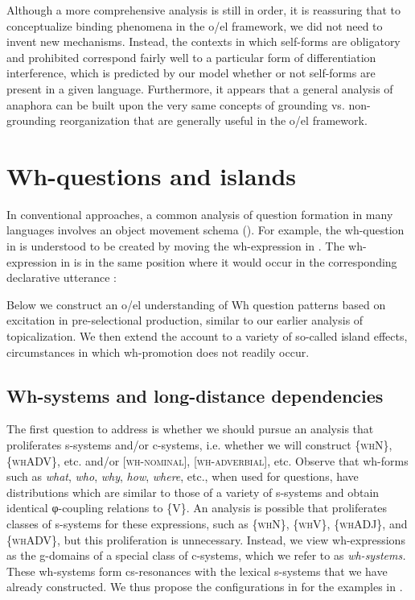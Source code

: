   Although a more comprehensive analysis is still in order, it is reassuring that to conceptualize binding phenomena in the o/el framework, we did not need to invent new mechanisms. Instead, the contexts in which self-forms are obligatory and prohibited correspond fairly well to a particular form of differentiation interference, which is predicted by our model whether or not self-forms are present in a given language. Furthermore, it appears that a general analysis of anaphora can be built upon the very same concepts of grounding vs. non-grounding reorganization that are generally useful in the o/el framework.

\section{Wh-questions and islands}

In conventional approaches, a common analysis of question formation in many languages involves an object movement schema (\citealt{Baker1970,Cheng1997,Chomsky1965,Karttunen1977}). For example, the wh-question in  is understood to be created by moving the wh-expression in . The wh-expression in  is in the same position where it would occur in the corresponding declarative utterance :

\ea\label{ex:7:17}
\label{ex:7:17a}
\label{ex:7:17b}
\label{ex:7:17c}
\z
\z

  Below we construct an o/el understanding of Wh question patterns based on excitation in pre-selectional production, similar to our earlier analysis of topicalization. We then extend the account to a variety of so-called island effects, circumstances in which wh-promotion does not readily occur. 

\subsection{Wh-systems and long-distance dependencies}

The first question to address is whether we should pursue an analysis that proliferates s-systems and/or c-systems, i.e. whether we will construct \{\textsc{whN}\}, \{\textsc{whADV}\}, etc. and/or [\textsc{wh-nominal}], [\textsc{wh-adverbial}], etc. Observe that wh-forms such as \textit{what}, \textit{who}, \textit{why}, \textit{how}, \textit{where}, etc., when used for questions, have distributions which are similar to those of a variety of s-systems and obtain identical φ-coupling relations to \{V\}. An analysis is possible that proliferates classes of s-systems for these expressions, such as \{\textsc{whN}\}, \{\textsc{whV}\}, \{\textsc{whADJ}\}, and \{\textsc{whADV}\}, but this proliferation is unnecessary. Instead, we view wh-expressions as the g-domains of a special class of c-systems, which we refer to as \textit{wh-systems.} These wh-systems form cs-resonances with the lexical s-systems that we have already constructed. We thus propose the configurations in {} for the examples in .

